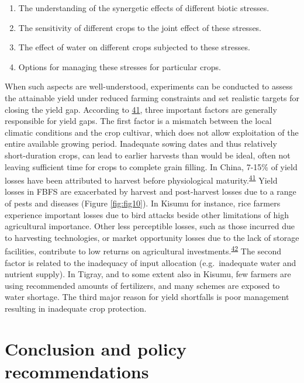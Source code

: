 \documentclass[]{elsarticle} %
\begin{document}
\begin{enumerate}
\def\labelenumi{\arabic{enumi}.}
\item
  The understanding of the synergetic effects of different biotic stresses.
\item
  The sensitivity of different crops to the joint effect of these stresses.
\item
  The effect of water on different crops subjected to these stresses.
\item
  Options for managing these stresses for particular crops.
\end{enumerate}

When such aspects are well-understood, experiments can be conducted to assess the attainable yield under reduced farming constraints and set realistic targets for closing the yield gap. According to \protect\hyperlink{ref-Meng_et_al_2013}{41}, three important factors are generally responsible for yield gaps. The first factor is a mismatch between the local climatic conditions and the crop cultivar, which does not allow exploitation of the entire available growing period. Inadequate sowing dates and thus relatively short-duration crops, can lead to earlier harvests than would be ideal, often not leaving sufficient time for crops to complete grain filling. In China, 7-15\% of yield losses have been attributed to harvest before physiological maturity.\textsuperscript{\protect\hyperlink{ref-Meng_et_al_2013}{41}} Yield losses in FBFS are exacerbated by harvest and post-harvest losses due to a range of pests and diseases (Figure \ref{fig:fig10}). In Kisumu for instance, rice farmers experience important losses due to bird attacks beside other limitations of high agricultural importance. Other less perceptible losses, such as those incurred due to harvesting technologies, or market opportunity losses due to the lack of storage facilities, contribute to low returns on agricultural investments.\textsuperscript{\protect\hyperlink{ref-VandenBerg_and_Singels_2013}{42}} The second factor is related to the inadequacy of input allocation (e.g.~inadequate water and nutrient supply). In Tigray, and to some extent also in Kisumu, few farmers are using recommended amounts of fertilizers, and many schemes are exposed to water shortage. The third major reason for yield shortfalls is poor management resulting in inadequate crop protection.

\hypertarget{conclusion-and-policy-recommendations}{%
\section{Conclusion and policy recommendations}\label{conclusion-and-policy-recommendations}}
\end{document}
